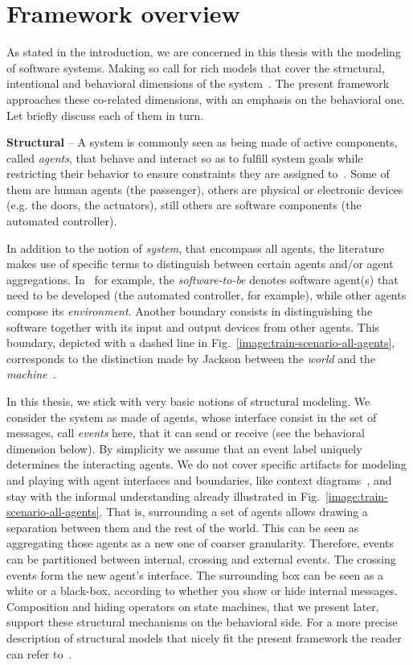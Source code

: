\section{Framework overview\label{section:background-multi-agent-systems-and-behavior-modeling}}

As stated in the introduction, we are concerned in this thesis with the modeling of software systems. Making so call for rich models that cover the structural, intentional and behavioral dimensions of the system~\cite{VanLamsweerde:2000}. The present framework approaches these co-related dimensions, with an emphasis on the behavioral one. Let briefly discuss each of them in turn.

\noindent \textbf{Structural} -- A system is commonly seen as being made of active components, called \emph{agents}, that behave and interact so as to fulfill system goals while restricting their behavior to ensure constraints they are assigned to~\cite{Feather:1987}. Some of them are human agents (the passenger), others are physical or electronic devices (e.g. the doors, the actuators), still others are software components (the automated controller).

In addition to the notion of \emph{system}, that encompass all agents, the literature makes use of specific terms to distinguish between certain agents and/or agent aggregations. In~\cite{VanLamsweerde:2009} for example, the \emph{software-to-be} denotes software agent(s) that need to be developed (the automated controller, for example), while other agents compose its \emph{environment}. Another boundary consists in distinguishing the software together with its input and output devices from other agents. This boundary, depicted with a dashed line in Fig.~\ref{image:train-scenario-all-agents}, corresponds to the distinction made by Jackson between the \emph{world} and the \emph{machine}~\cite{Jackson:1995}.

In this thesis, we stick with very basic notions of structural modeling. We consider the system as made of agents, whose interface consist in the set of messages, call \emph{events} here, that it can send or receive (see the behavioral dimension below). By simplicity we assume that an event label uniquely determines the interacting agents. We do not cover specific artifacts for modeling and playing with agent interfaces and boundaries, like context diagrams~\cite{Feather:1987}, and stay with the informal understanding already illustrated in Fig.~\ref{image:train-scenario-all-agents}. That is, surrounding a set of agents allows drawing a separation between them and the rest of the world. This can be seen as aggregating those agents as a new one of coarser granularity. Therefore, events can be partitioned between internal, crossing and external events. The crossing events form the new agent's interface. The surrounding box can be seen as a white or a black-box, according to whether you show or hide internal messages. Composition and hiding operators on state machines, that we present later, support these structural mechanisms on the behavioral side. For a more precise description of structural models that nicely fit the present framework the reader can refer to~\cite{Magee:1995}.

